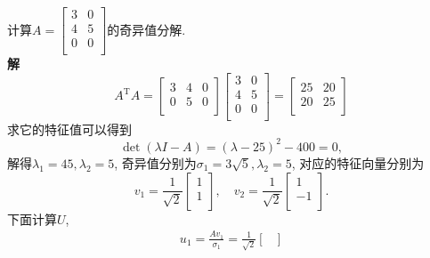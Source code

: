 
\begin{example}
    计算$A = \begin{bmatrix}
     3 & 0\\
     4 & 5\\
     0 & 0\\
    \end{bmatrix}$的奇异值分解.
    \\
    \textbf{解 } 
    \begin{equation}
      A^{\mathrm{T}}A = \begin{bmatrix}
       3 & 4 & 0\\
       0 & 5 & 0\\
      \end{bmatrix}
      \begin{bmatrix}
       3 & 0\\
       4 & 5\\
       0 & 0\\
      \end{bmatrix}
      = 
      \begin{bmatrix}
       25 & 20\\
       20 & 25\\
      \end{bmatrix}
    \end{equation}
    求它的特征值可以得到
    \begin{equation}
      \det\left( \lambda I - A \right) = \left( \lambda - 25 \right) ^{2} - 400 = 0,
    \end{equation}
    解得$\lambda_1 = 45, \lambda_2 = 5$, 奇异值分别为$\sigma_1 = 3\sqrt{5}, \lambda_2 = 5$, 对应的特征向量分别为
    \begin{equation}
      v_1 = \frac{1}{\sqrt{2}}\begin{bmatrix}
       1\\
       1\\
      \end{bmatrix},
      \quad
      v_2 = \frac{1}{\sqrt{2}}\begin{bmatrix}
       1\\
       -1\\
      \end{bmatrix}.
    \end{equation}
    下面计算$U$,
    \begin{equation}
      \begin{aligned}
        u_1 = \frac{Av_1}{\sigma_1} = \frac{1}{\sqrt{2}} \begin{bmatrix}

\end{bmatrix}
\end{aligned}
\end{equation}
\end{example}
